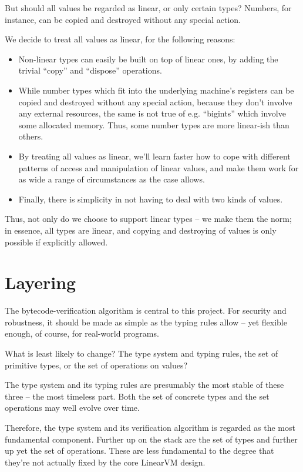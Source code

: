 \documentclass[a4paper]{book}
\begin{document}
But should all values be regarded as linear, or only certain types? Numbers,
for instance, can be copied and destroyed without any special action.

We decide to treat all values as linear, for the following reasons:
\begin{itemize}
\item Non-linear types can easily be built on top of linear ones, by adding
  the trivial ``copy'' and ``dispose'' operations.
\item While number types which fit into the underlying machine's registers
  can be copied and destroyed without any special action, because they
  don't involve any external resources, the same is not true of
  e.g. ``bigints'' which involve some allocated memory.
  Thus, some number types are more linear-ish than others.
\item By treating all values as linear, we'll learn faster how to cope with
  different patterns of access and manipulation of linear values, and
  make them work for as wide a range of circumstances as the case allows.
\item Finally, there is simplicity in not having to deal with two
  kinds of values.
\end{itemize}

Thus, not only do we choose to support linear types -- we make them the
norm; in essence, all types are linear, and copying and destroying of values
is only possible if explicitly allowed.

\section{Layering}
The bytecode-verification algorithm is central to this project.
For security and robustness, it should be made as simple as the
typing rules allow -- yet flexible enough, of course, for real-world
programs.

What is least likely to change? The type system and typing rules, the
set of primitive types, or the set of operations on values?

The type system and its typing rules are presumably the most stable of
these three -- the most timeless part. Both the set of concrete types
and the set operations may well evolve over time.

Therefore, the type system and its verification algorithm is regarded
as the most fundamental component. Further up on the stack are the set
of types and further up yet the set of operations. These are less
fundamental to the degree that they're not actually fixed by the core
LinearVM design.
\end{document}
